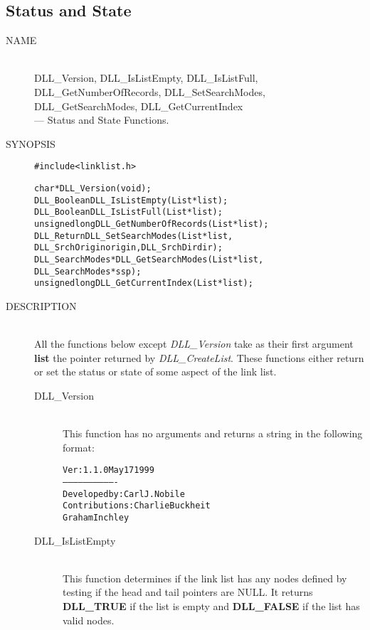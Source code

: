\documentclass[10pt,letterpaper,titlepage]{article}
\begin{document}
\subsection{Status and State}
\begin{description}
\item[NAME]\quad\\
DLL\_Version, DLL\_IsListEmpty, DLL\_IsListFull,\\
DLL\_GetNumberOfRecords, DLL\_SetSearchModes,\\
DLL\_GetSearchModes, DLL\_GetCurrentIndex\\
 --- Status and State Functions.

\item[SYNOPSIS]
\begin{alltt}

#include <linklist.h>

char *DLL_Version(void);
DLL_Boolean DLL_IsListEmpty(List *list);
DLL_Boolean DLL_IsListFull(List *list);
unsigned long DLL_GetNumberOfRecords(List *list);
DLL_Return DLL_SetSearchModes(List *list,
            DLL_SrchOrigin origin, DLL_SrchDir dir);
DLL_SearchModes *DLL_GetSearchModes(List *list,
                  DLL_SearchModes *ssp);
unsigned long DLL_GetCurrentIndex(List *list);
\end{alltt}

\item[DESCRIPTION]\quad\\
All the functions below except \emph{DLL\_Version} take as their first argument \textbf{list} the pointer returned by \emph{DLL\_CreateList}.  These functions either return or set the status or state of some aspect of the link list.

 \begin{description}
 \item[DLL\_Version]\quad\\
 This function has no arguments and returns a string in the following format:
 \begin{alltt}
Ver: 1.1.0  May 17 1999
-------------------------------
 Developed by: Carl J. Nobile
Contributions: Charlie Buckheit
               Graham Inchley
 \end{alltt}
 \vspace{-16pt}
 \item[DLL\_IsListEmpty]\quad\\
 This function determines if the link list has any nodes defined by testing if the head and tail pointers are NULL.  It returns \textbf{DLL\_TRUE} if the list is empty and \textbf{DLL\_FALSE} if the list has valid nodes.


\end{description}
\end{description}
\end{document}

